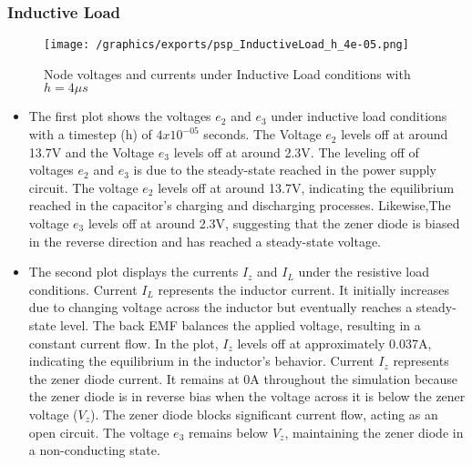 \subsubsection{Inductive Load}
\begin{figure}[H]
    \centering
    \texttt{[image: /graphics/exports/psp\_InductiveLoad\_h\_4e-05.png]}
    \caption{Node voltages and currents under Inductive Load conditions with $h=4\mu s$}
\end{figure}
\begin{itemize}
	\item The first plot shows the voltages $e_2$ and $e_3$ under inductive load conditions with a timestep (h) of $4x10^{-05}$ seconds. The Voltage $e_2$ levels off at around 13.7V and the Voltage $e_3$ levels off at around 2.3V. The leveling off of voltages $e_2$ and $e_3$ is due to the steady-state reached in the power supply circuit. The voltage $e_2$ levels off at around 13.7V, indicating the equilibrium reached in the capacitor's charging and discharging processes. Likewise,The voltage $e_3$ levels off at around 2.3V, suggesting that the zener diode is biased in the reverse direction and has reached a steady-state voltage.
    \item The second plot displays the currents $I_z$ and $I_L$ under the resistive load conditions. Current $I_L$ represents the inductor current. It initially increases due to changing voltage across the inductor but eventually reaches a steady-state level. The back EMF balances the applied voltage, resulting in a constant current flow. In the plot, $I_z$ levels off at approximately 0.037A, indicating the equilibrium in the inductor's behavior. Current $I_z$ represents the zener diode current. It remains at 0A throughout the simulation because the zener diode is in reverse bias when the voltage across it is below the zener voltage ($V_z$). The zener diode blocks significant current flow, acting as an open circuit. The voltage $e_3$ remains below $V_z$, maintaining the zener diode in a non-conducting state.
\end{itemize}

